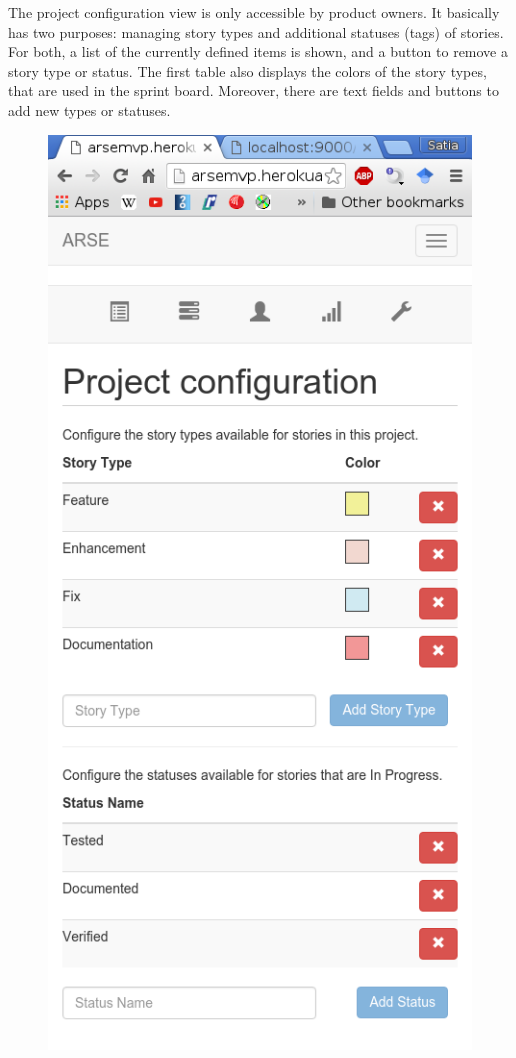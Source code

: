 \documentclass[
	accentcolor=tud1a %
]{tudreport}
\begin{document}
The project configuration view is only accessible by product owners. It basically has two purposes: managing story types and additional statuses (tags) of stories. For both, a list of the currently defined items is shown, and a button to remove a story type or status. The first table also displays the colors of the story types, that are used in the sprint board. Moreover, there are text fields and buttons to add new types or statuses. 
\begin{figure}[ht]
\centering
\begin{minipage}{.5\textwidth}
  \centering
	\includegraphics[height=28EM]{img/configuration}

\end{minipage}
\end{figure}
\end{document}

